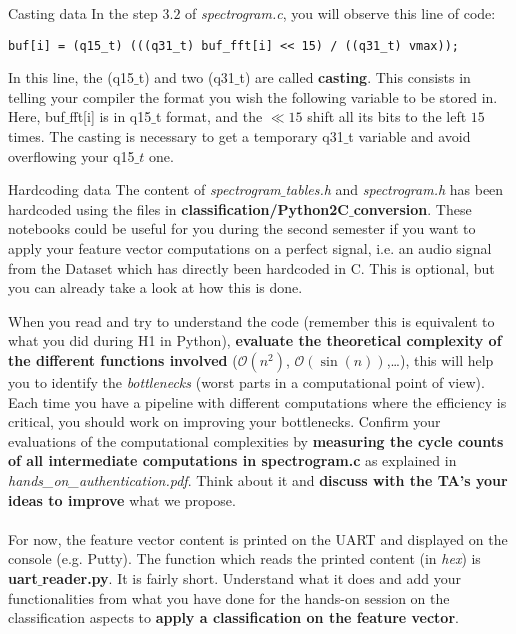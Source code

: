 \begin{bclogo}[couleur = gray!20, arrondi = 0.2, logo=\bcinfo]{Casting data}
%
In the step $3.2$ of \emph{spectrogram.c}, you will observe this line of code:
%
\begin{lstlisting}
buf[i] = (q15_t) (((q31_t) buf_fft[i] << 15) / ((q31_t) vmax));
\end{lstlisting}
%
In this line, the (q15$\_$t) and two (q31$\_$t) are called \textbf{casting}. This consists in telling your compiler the format you wish the following variable to be stored in. Here, buf$\_$fft[i] is in q15$\_$t format, and the $\ll 15$ shift all its bits to the left $15$ times. The casting is necessary to get a temporary q31$\_$t variable and avoid overflowing your q15$\_t$ one.
%
\end{bclogo}
%
\begin{bclogo}[couleur = gray!20, arrondi = 0.2, logo=\bcinfo]{Hardcoding data}
The content of \emph{spectrogram$\_$tables.h} and \emph{spectrogram.h} has been hardcoded using the files in \textbf{classification/Python2C$\_$conversion}. These notebooks could be useful for you during the second semester if you want to apply your feature vector computations on a perfect signal, i.e. an audio signal from the Dataset which has directly been hardcoded in C. This is optional, but you can already take a look at how this is done.
\end{bclogo}
%
When you read and try to understand the code (remember this is equivalent to what you did during H1 in Python), \textbf{evaluate the theoretical complexity of the different functions involved} ($\mathcal O(n^2)$, $\mathcal O(\sin (n))$,\ldots), this will help you to identify the \emph{bottlenecks} (worst parts in a computational point of view). Each time you have a pipeline with different computations where the efficiency is critical, you should work on improving your bottlenecks. Confirm your evaluations of the computational complexities by \textbf{measuring the cycle counts of all intermediate computations in spectrogram.c} as explained in \emph{hands\_on\_authentication.pdf}.
Think about it and \textbf{discuss with the TA's your ideas to improve} what we propose. \\
\\
For now, the feature vector content is printed on the UART and displayed on the console (e.g. Putty). The function which reads the printed content (in \emph{hex}) is \textbf{uart$\_$reader.py}. It is fairly short. Understand what it does and add your functionalities from what you have done for the hands-on session on the classification aspects to \textbf{apply a classification on the feature vector}. \\
